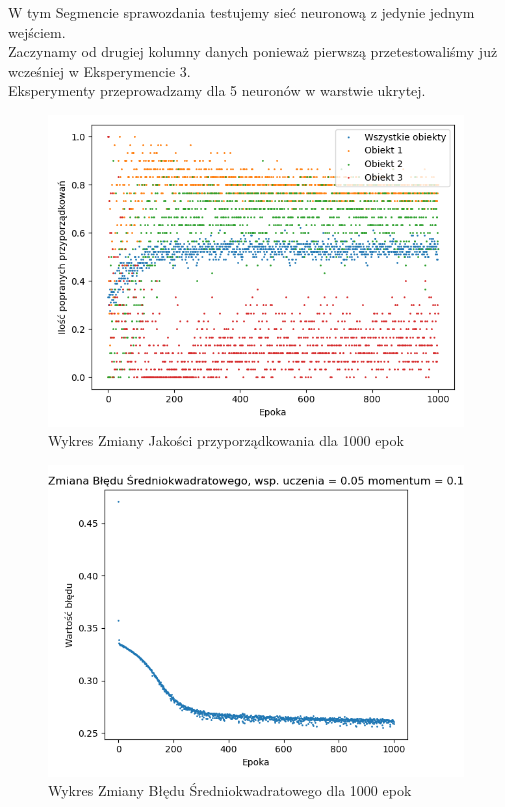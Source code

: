 \documentclass[12pt]{article}
\begin{document}
W tym Segmencie sprawozdania testujemy sieć neuronową z jedynie jednym wejściem.\\ Zaczynamy od drugiej kolumny danych ponieważ pierwszą przetestowaliśmy już wcześniej w Eksperymencie 3.\\ Eksperymenty przeprowadzamy dla 5 neuronów w warstwie ukrytej.

\begin{figure}[!ht]
 \centering
 \includegraphics[width=11cm]{WykresPrzyporzadkowania5neuron1wejscia.png}
 \caption{Wykres Zmiany Jakości przyporządkowania dla 1000 epok}
 \vspace{-0.1cm}
 \label{WykresPrzyp18}
\end{figure}

\newpage

\begin{figure}[!ht]
 \centering
 \includegraphics[width=11cm]{WykresBlad5neuron1wejscia1.png}
 \caption{Wykres Zmiany Błędu Średniokwadratowego dla 1000 epok}
 \vspace{-0.1cm}
 \label{WykresBlad18}
\end{figure}
\end{document}
